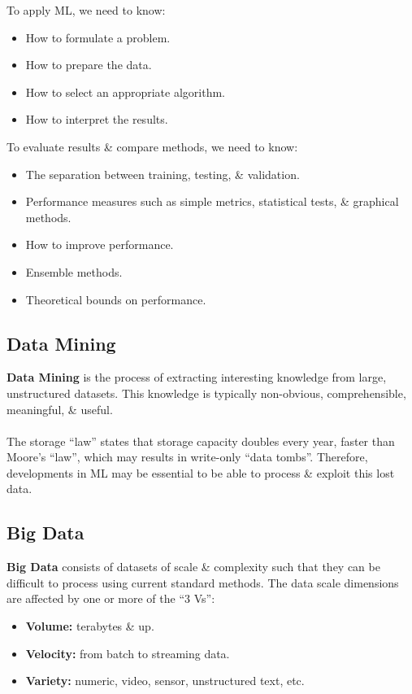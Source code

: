 \documentclass[a4paper,11pt]{article}
\begin{document}
To apply ML, we need to know:
\begin{itemize}
    \item   How to formulate a problem.
    \item   How to prepare the data.
    \item   How to select an appropriate algorithm.
    \item   How to interpret the results.
\end{itemize}

To evaluate results \& compare methods, we need to know:
\begin{itemize}
    \item   The separation between training, testing, \& validation.
    \item   Performance measures such as simple metrics, statistical tests, \& graphical methods.
    \item   How to improve performance.
    \item   Ensemble methods.
    \item   Theoretical bounds on performance.
\end{itemize}

\subsection{Data Mining}
\textbf{Data Mining} is the process of extracting interesting knowledge from large, unstructured datasets.
This knowledge is typically non-obvious, comprehensible, meaningful, \& useful.
\\\\
The storage ``law'' states that storage capacity doubles every year, faster than Moore's ``law'', which may results 
in write-only ``data tombs''. 
Therefore, developments in ML may be essential to be able to process \& exploit this lost data.

\subsection{Big Data}
\textbf{Big Data} consists of datasets of scale \& complexity such that they can be difficult to process using 
current standard methods.
The data scale dimensions are affected by one or more of the ``3 Vs'':
\begin{itemize}
    \item   \textbf{Volume:} terabytes \& up.
    \item   \textbf{Velocity:} from batch to streaming data.
    \item   \textbf{Variety:} numeric, video, sensor, unstructured text, etc.
\end{itemize}
\end{document}
